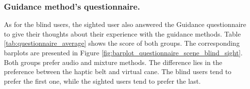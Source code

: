 \subsubsection{Guidance method's questionnaire.}
\label{subsubsec:results_questionnaires_2}

As for the blind users, the sighted user also answered the Guidance questionnaire to give their thoughts about their experience with the guidance methods. Table \ref{tab:questionnaire_average} shows the score of both groups. The corresponding barplots are presented in Figure \ref{fig:barplot_questionnaire_scene_blind_sight}. Both groups prefer audio  and mixture methods. The difference lies in the preference between the haptic belt and virtual cane. The blind users tend to prefer the first one, while the sighted users tend to prefer the last.



